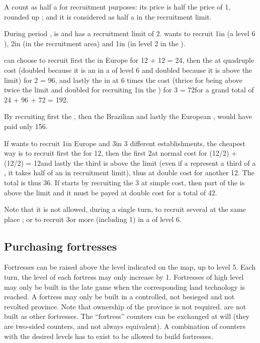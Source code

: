 \aparag[Exploration.] A \LDE count as half a \LD for recruitment purposes: its
price is half the price of 1\LD, rounded up ; and it is considered as half a
\LD in the recruitment limit.

\begin{exemple}
  During period , \POR is \TREN and has a recruitment limit of
  2\LD. \POR wants to recruit 1\ARMY\Facemoins in  (a level
  6 \COL), 2\LD in \provinceTejo (in the recruitment area) and 1\LD in
  \continentBrazil (in level 2 \COL in the \ROTW).

  \POR can choose to recruit first the \LD in Europe for 12 + 12 = 24\ducats,
  then the \ARMY\Facemoins at quadruple cost (doubled because it is an
  \ARMY\Facemoins in a \COL of level 6 and doubled because it is above the
  limit) for 2   = 96\ducats, and lastly the
  \LD in \continentBrazil at 6 times the cost (thrice for being above twice
  the limit and doubled for recruiting 1\LD in the \ROTW) for 3   = 72\ducats for a grand total of 24 + 96 + 72 =
  192\ducats.

  By recruiting first the \ARMY\Facemoins, then the Brazilian \LD and lastly
  the European \LD, \POR would have paid only 156\ducats.

  If \POR wants to recruit 1\LD in Europe and 3\LDE in 3 different \ROTW
  establishments, the cheapest way is to recruit first the \LD for 12\ducats,
  then the first 2\LDE at normal cost for (12/2) + (12/2) = 12\ducats and
  lastly the third \LDE is above the limit (even if a \LDE represent a third
  of a \LD, it takes half of an \LD in recruitment limit), thus at double cost
  for another 12\ducats. The total is thus 36\ducats. If \POR starts by
  recruiting the 3 \LDE at simple cost, then part of the \LD is above the
  limit and it must be payed at double cost for a total of 42\ducats.

  Note that it is not allowed, during a single turn, to recruit several \LDE
  at the same place ; or to recruit 3\LD or more (including 1\ARMY\Faceplus)
  in a \COL of level 6.
\end{exemple}



\subsection{Purchasing fortresses}

\aparag[Generalities.] Fortresses can be raised above the level indicated on
the map, up to level 5.
\bparag Each turn, the level of each fortress may only increase by 1.
\bparag Fortresses of high level may only be built in the late game when the
corresponding land technology is reached.
\bparag A fortress may only be built in a controlled, not besieged and not
revolted province. Note that ownership of the province is not required.
\bparag \Presidios are not built as other fortresses.
\bparag The ``fortress'' counters can be exchanged at will (they are two-sided
counters, and not always equivalent). A combination of counters with the
desired levels has to exist to be allowed to build fortresses.

